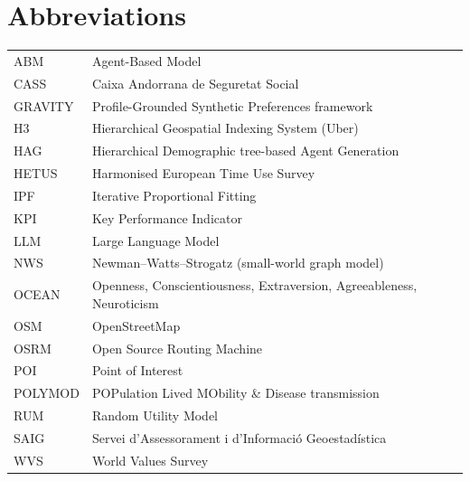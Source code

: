 \documentclass[a4paper,12pt]{article}
\begin{document}
\section*{Abbreviations}
\noindent
\begin{tabular}{@{}ll}
ABM     & Agent-Based Model \\
CASS    & Caixa Andorrana de Seguretat Social \\
GRAVITY & Profile-Grounded Synthetic Preferences framework~\cite{gravity2025} \\
H3      & Hierarchical Geospatial Indexing System (Uber) \\
HAG     & Hierarchical Demographic tree-based Agent Generation \\
HETUS   & Harmonised European Time Use Survey \\
IPF     & Iterative Proportional Fitting \\
KPI     & Key Performance Indicator \\
LLM     & Large Language Model \\
NWS     & Newman--Watts--Strogatz (small-world graph model) \\
OCEAN   & Openness, Conscientiousness, Extraversion, Agreeableness, Neuroticism \\
OSM     & OpenStreetMap \\
OSRM    & Open Source Routing Machine \\
POI     & Point of Interest \\
POLYMOD & POPulation Lived MObility \& Disease transmission \\
RUM     & Random Utility Model \\
SAIG    & Servei d'Assessorament i d'Informaci\'o Geoestad\'istica \\
WVS     & World Values Survey \\
\end{tabular}
\end{document}
